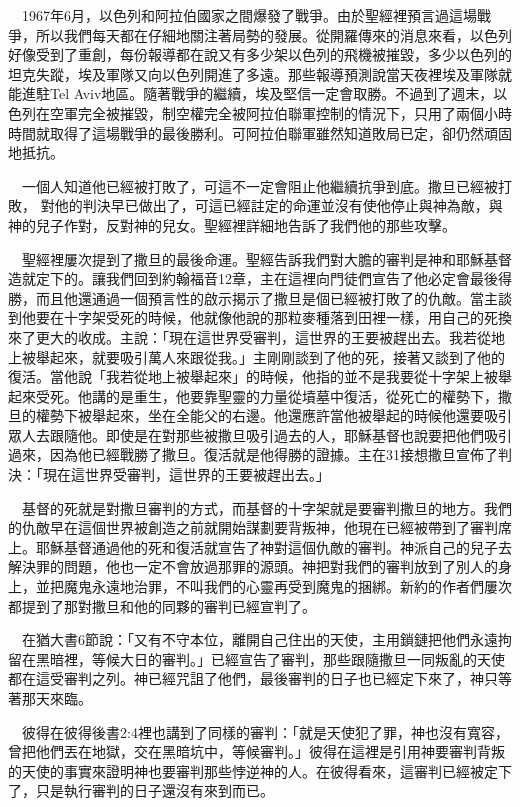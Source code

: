 \documentclass{book}
\begin{document}
　1967年6月，以色列和阿拉伯國家之間爆發了戰爭。由於聖經裡預言過這場戰爭，所以我們每天都在仔細地關注著局勢的發展。從開羅傳來的消息來看，以色列好像受到了重創，每份報導都在說又有多少架以色列的飛機被摧毀，多少以色列的坦克失蹤，埃及軍隊又向以色列開進了多遠。那些報導預測說當天夜裡埃及軍隊就能進駐Tel Aviv地區。隨著戰爭的繼續，埃及堅信一定會取勝。不過到了週末，以色列在空軍完全被摧毀，制空權完全被阿拉伯聯軍控制的情況下，只用了兩個小時時間就取得了這場戰爭的最後勝利。可阿拉伯聯軍雖然知道敗局已定，卻仍然頑固地抵抗。

　一個人知道他已經被打敗了，可這不一定會阻止他繼續抗爭到底。撒旦已經被打敗， 對他的判決早已做出了，可這已經註定的命運並沒有使他停止與神為敵，與神的兒子作對，反對神的兒女。聖經裡詳細地告訴了我們他的那些攻擊。

　聖經裡屢次提到了撒旦的最後命運。聖經告訴我們對大膽的審判是神和耶穌基督造就定下的。讓我們回到約翰福音12章，主在這裡向門徒們宣告了他必定會最後得勝，而且他還通過一個預言性的啟示揭示了撒旦是個已經被打敗了的仇敵。當主談到他要在十字架受死的時候，他就像他說的那粒麥種落到田裡一樣，用自己的死換來了更大的收成。主說：「現在這世界受審判，這世界的王要被趕出去。我若從地上被舉起來，就要吸引萬人來跟從我。」主剛剛談到了他的死，接著又談到了他的復活。當他說「我若從地上被舉起來」的時候，他指的並不是我要從十字架上被舉起來受死。他講的是重生，他要靠聖靈的力量從墳墓中復活，從死亡的權勢下，撒旦的權勢下被舉起來，坐在全能父的右邊。他還應許當他被舉起的時候他還要吸引眾人去跟隨他。即使是在對那些被撒旦吸引過去的人，耶穌基督也說要把他們吸引過來，因為他已經戰勝了撒旦。復活就是他得勝的證據。主在31接想撒旦宣佈了判決：「現在這世界受審判，這世界的王要被趕出去。」

　基督的死就是對撒旦審判的方式，而基督的十字架就是要審判撒旦的地方。我們的仇敵早在這個世界被創造之前就開始謀劃要背叛神，他現在已經被帶到了審判席上。耶穌基督通過他的死和復活就宣告了神對這個仇敵的審判。神派自己的兒子去解決罪的問題，他也一定不會放過那罪的源頭。神把對我們的審判放到了別人的身上，並把魔鬼永遠地治罪，不叫我們的心靈再受到魔鬼的捆綁。新約的作者們屢次都提到了那對撒旦和他的同夥的審判已經宣判了。

　在猶大書6節說：「又有不守本位，離開自己住出的天使，主用鎖鏈把他們永遠拘留在黑暗裡，等候大日的審判。」已經宣告了審判，那些跟隨撒旦一同叛亂的天使都在這受審判之列。神已經咒詛了他們，最後審判的日子也已經定下來了，神只等著那天來臨。

　彼得在彼得後書2:4裡也講到了同樣的審判：「就是天使犯了罪，神也沒有寬容，曾把他們丟在地獄，交在黑暗坑中，等候審判。」彼得在這裡是引用神要審判背叛的天使的事實來證明神也要審判那些悖逆神的人。在彼得看來，這審判已經被定下了，只是執行審判的日子還沒有來到而已。
\end{document}
